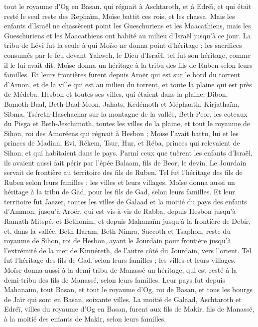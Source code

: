 \begin{multicols}{2}
tout le royaume d’Og en Basan, qui régnait à Aschtaroth, et à Edréï, et qui était resté le seul reste des Rephaïm, Moïse battit ces rois, et les chassa.
Mais les enfants d’Israël ne chassèrent point les Gueschuriens et les Maacathiens, mais les Gueschuriens et les Maacathiens ont habité au milieu d’Israël jusqu’à ce jour.
La tribu de Lévi fut la seule à qui Moïse ne donna point d’héritage ; les sacrifices consumés par le feu devant Yahweh, le Dieu d’Israël, tel fut son héritage, comme il le lui avait dit.
Moïse donna un héritage à la tribu des fils de Ruben selon leurs familles.
Et leurs frontières furent depuis Aroër qui est sur le bord du torrent d’Arnon, et de la ville qui est au milieu du torrent, et toute la plaine qui est près de Médeba.
Hesbon et toutes ses villes, qui étaient dans la plaine, Dibon, Bamoth-Baal, Beth-Baal-Meon,
Jahats, Kedémoth et Méphaath,
Kirjathaïm, Sibma, Tséreth-Haschachar sur la montagne de la vallée,
Beth-Peor, les coteaux du Pisga et Beth-Jeschimoth,
toutes les villes de la plaine, et tout le royaume de Sihon, roi des Amoréens qui régnait à Hesbon ; Moïse l’avait battu, lui et les princes de Madian, Evi, Rékem, Tsur, Hur, et Réba, princes qui relevaient de Sihon, et qui habitaient dans le pays.
Parmi ceux que tuèrent les enfants d’Israël, ils avaient aussi fait périr par l’épée Balaam\FTNT{}, fils de Beor, le devin.
Le Jourdain servait de frontière au territoire des fils de Ruben. Tel fut l’héritage des fils de Ruben selon leurs familles ; les villes et leurs villages.
Moïse donna aussi un héritage à la tribu de Gad, pour les fils de Gad, selon leurs familles.
Et leur territoire fut Jaezer, toutes les villes de Galaad et la moitié du pays des enfants d’Ammon, jusqu’à Aroër, qui est vis-à-vis de Rabba,
depuis Hesbon jusqu’à Ramath-Mitspé, et Bethonim, et depuis Mahanaïm jusqu’à la frontière de Debir,
et, dans la vallée, Beth-Haram, Beth-Nimra, Succoth et Tsaphon, reste du royaume de Sihon, roi de Hesbon, ayant le Jourdain pour frontière jusqu’à l’extrémité de la mer de Kinnéreth, de l’autre côté du Jourdain, vers l’orient.
Tel fut l’héritage des fils de Gad, selon leurs familles ; les villes et leurs villages.
Moïse donna aussi à la demi-tribu de Manassé un héritage, qui est resté à la demi-tribu des fils de Manassé, selon leurs familles.
Leur pays fut depuis Mahanaïm, tout Basan, et tout le royaume d’Og, roi de Basan, et tous les bourgs de Jaïr qui sont en Basan, soixante villes.
La moitié de Galaad, Aschtaroth et Edréï, villes du royaume d’Og en Basan, furent aux fils de Makir, fils de Manassé, à la moitié des enfants de Makir, selon leurs familles.

\end{multicols}
